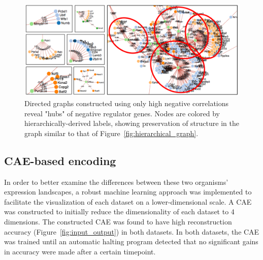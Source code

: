 \documentclass[12pt,oneside,onecolumn,a4paper]{article}
\begin{document}
\begin{figure}[H]
\begin{center}
\includegraphics[width=\columnwidth]{figures/regulators}
\caption{Directed graphs constructed using only high negative correlations reveal "hubs" of negative regulator genes. Nodes are colored by hierarchically-derived labels, showing preservation of structure in the graph similar to that of Figure~\ref{fig:hierarchical_graph}.\label{fig:regulators}%
}
\end{center}
\end{figure}

\subsection{CAE-based encoding}

In order to better examine the differences between these two organisms' expression landscapes, a robust machine learning approach was implemented to facilitate the visualization of each dataset on a lower-dimensional scale. A CAE was constructed to initially reduce the dimensionality of each dataset to 4 dimensions. The constructed CAE was found to have high reconstruction accuracy (Figure~\ref{fig:input_output}) in both datasets. In both datasets, the CAE was trained until an automatic halting program detected that no significant gains in accuracy were made after a certain timepoint.
\end{document}
